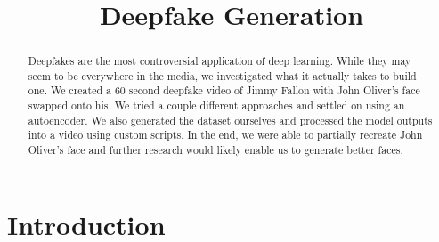 \documentclass{article}
\title{Deepfake Generation}
\begin{document}
\maketitle

\begin{abstract}
Deepfakes are the most controversial application of deep learning. While they may seem to be everywhere in the media, we investigated what it actually takes to build one. We created a 60 second deepfake video of Jimmy Fallon with John Oliver’s face swapped onto his. We tried a couple different approaches and settled on using an autoencoder. We also generated the dataset ourselves and processed the model outputs into a video using custom scripts. In the end, we were able to partially recreate John Oliver’s face and further research would likely enable us to generate better faces.
\end{abstract}

\section{Introduction}
\end{document}
